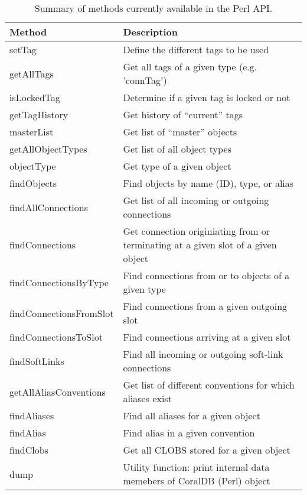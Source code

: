 \begin{table}[h]
\begin{center}
\begin{tabular}{|l|p{11cm}|}
\hline
Method & Description \\ \hline
\hline
setTag & Define the different tags to be used \\ \hline
getAllTags & Get all tags of a given type (e.g. 'connTag')\\ \hline
isLockedTag & Determine if a given tag is locked or not\\ \hline
getTagHistory & Get history of ``current'' tags\\ \hline
masterList & Get list of ``master'' objects \\ \hline
getAllObjectTypes & Get list of all object types \\ \hline
objectType & Get type of a given object\\ \hline
findObjects & Find objects by name (ID), type, or alias\\ \hline
findAllConnections & Get list of all incoming or outgoing connections\\ \hline
findConnections & Get connection originiating from or terminating at a given slot of a given object\\ \hline
findConnectionsByType & Find connections from or to objects of a given type\\ \hline
findConnectionsFromSlot & Find connections from a given outgoing slot\\ \hline
findConnectionsToSlot & Find connections arriving at a given slot\\ \hline
findSoftLinks & Find all incoming or outgoing soft-link connections\\ \hline
getAllAliasConventions & Get list of different conventions for which aliases exist\\ \hline
findAliases & Find all aliases for a given object\\ \hline
findAlias & Find alias in a given convention\\ \hline
findClobs & Get all CLOBS stored for a given object\\ \hline
\hline
dump & Utility function: print internal data memebers of CoralDB (Perl) object\\ \hline
\end{tabular}
\caption[Perl API summary]
{Summary of methods currently available in the Perl API.}
\label{PERLAPI}
\end{center}
\end{table}


